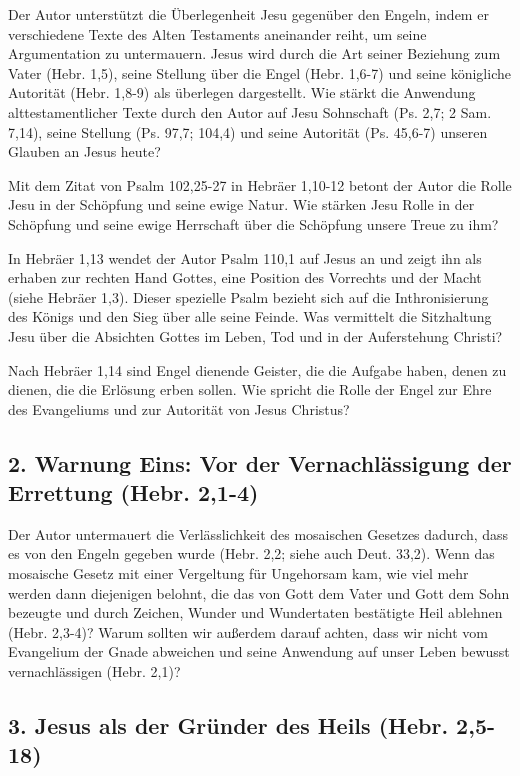 \documentclass[]{book}
\begin{document}
Der Autor unterstützt die Überlegenheit Jesu gegenüber den Engeln, indem
er verschiedene Texte des Alten Testaments aneinander reiht, um seine
Argumentation zu untermauern. Jesus wird durch die Art seiner Beziehung
zum Vater (Hebr. 1,5), seine Stellung über die Engel (Hebr. 1,6-7) und
seine königliche Autorität (Hebr. 1,8-9) als überlegen dargestellt. Wie
stärkt die Anwendung alttestamentlicher Texte durch den Autor auf Jesu
Sohnschaft (Ps. 2,7; 2 Sam. 7,14), seine Stellung (Ps. 97,7; 104,4) und
seine Autorität (Ps. 45,6-7) unseren Glauben an Jesus heute?

Mit dem Zitat von Psalm 102,25-27 in Hebräer 1,10-12 betont der Autor
die Rolle Jesu in der Schöpfung und seine ewige Natur. Wie stärken Jesu
Rolle in der Schöpfung und seine ewige Herrschaft über die Schöpfung
unsere Treue zu ihm?

In Hebräer 1,13 wendet der Autor Psalm 110,1 auf Jesus an und zeigt ihn
als erhaben zur rechten Hand Gottes, eine Position des Vorrechts und der
Macht (siehe Hebräer 1,3). Dieser spezielle Psalm bezieht sich auf die
Inthronisierung des Königs und den Sieg über alle seine Feinde. Was
vermittelt die Sitzhaltung Jesu über die Absichten Gottes im Leben, Tod
und in der Auferstehung Christi?

Nach Hebräer 1,14 sind Engel dienende Geister, die die Aufgabe haben,
denen zu dienen, die die Erlösung erben sollen. Wie spricht die Rolle
der Engel zur Ehre des Evangeliums und zur Autorität von Jesus Christus?

\subsection{2. Warnung Eins: Vor der Vernachlässigung der Errettung
(Hebr.
2,1-4)}\label{warnung-eins-vor-der-vernachluxe4ssigung-der-errettung-hebr.-21-4}

Der Autor untermauert die Verlässlichkeit des mosaischen Gesetzes
dadurch, dass es von den Engeln gegeben wurde (Hebr. 2,2; siehe auch
Deut. 33,2). Wenn das mosaische Gesetz mit einer Vergeltung für
Ungehorsam kam, wie viel mehr werden dann diejenigen belohnt, die das
von Gott dem Vater und Gott dem Sohn bezeugte und durch Zeichen, Wunder
und Wundertaten bestätigte Heil ablehnen (Hebr. 2,3-4)? Warum sollten
wir außerdem darauf achten, dass wir nicht vom Evangelium der Gnade
abweichen und seine Anwendung auf unser Leben bewusst vernachlässigen
(Hebr. 2,1)?

\subsection{3. Jesus als der Gründer des Heils (Hebr.
2,5-18)}\label{jesus-als-der-gruxfcnder-des-heils-hebr.-25-18}
\end{document}
